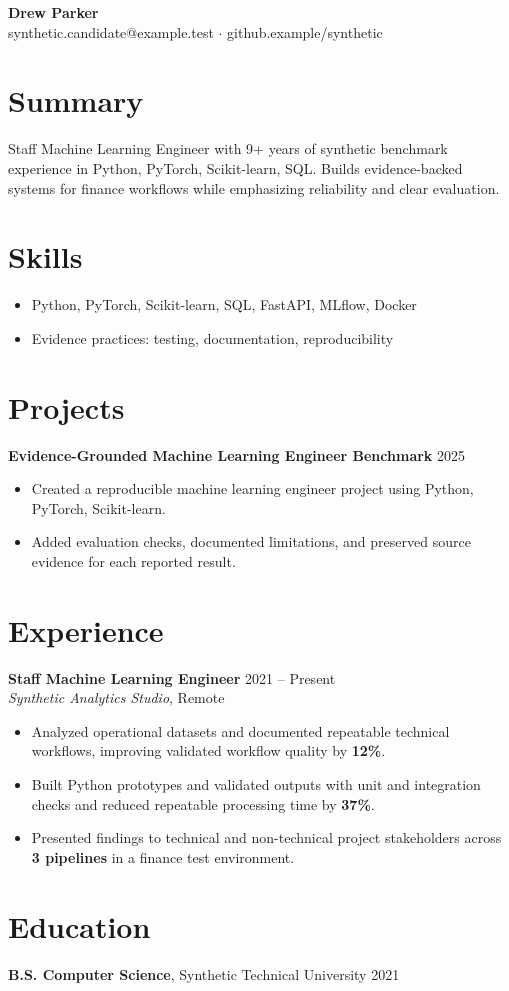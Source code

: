 \documentclass[10pt,letterpaper]{article}
\begin{document}
\begin{center}
{\Large \textbf{Drew Parker}}\\
synthetic.candidate@example.test $\cdot$ github.example/synthetic
\end{center}

\section*{Summary}
Staff Machine Learning Engineer with 9+ years of synthetic benchmark experience in Python, PyTorch, Scikit-learn, SQL. Builds evidence-backed systems for finance workflows while emphasizing reliability and clear evaluation.

\section*{Skills}
\begin{itemize}
  \item Python, PyTorch, Scikit-learn, SQL, FastAPI, MLflow, Docker
  \item Evidence practices: testing, documentation, reproducibility
\end{itemize}

\section*{Projects}
\textbf{Evidence-Grounded Machine Learning Engineer Benchmark} \hfill 2025
\begin{itemize}
  \item Created a reproducible machine learning engineer project using Python, PyTorch, Scikit-learn.
  \item Added evaluation checks, documented limitations, and preserved source evidence for each reported result.
\end{itemize}

\section*{Experience}
\textbf{Staff Machine Learning Engineer} \hfill 2021 -- Present\\
\textit{Synthetic Analytics Studio}, Remote
\begin{itemize}
  \item Analyzed operational datasets and documented repeatable technical workflows, improving validated workflow quality by \textbf{12\%}.
  \item Built Python prototypes and validated outputs with unit and integration checks and reduced repeatable processing time by \textbf{37\%}.
  \item Presented findings to technical and non-technical project stakeholders across \textbf{3 pipelines} in a finance test environment.
\end{itemize}

\section*{Education}
\textbf{B.S. Computer Science}, Synthetic Technical University \hfill 2021
\end{document}
